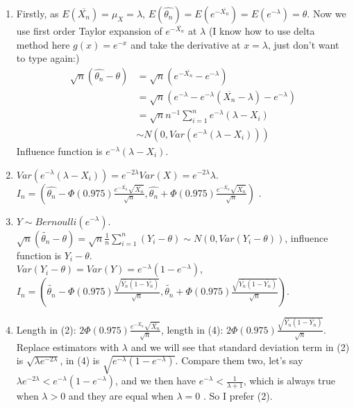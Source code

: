 \documentclass[12pt,letterpaper, onecolumn]{exam}
\begin{document}
\begin{questions}
\begin{solution}
\begin{enumerate}
            \item Firstly, as $E(\overline{X_n})=\mu_X = \lambda$, $E(\hat{\theta_n}) = E(e^{-\overline{X_n}}) =E(e^{-\lambda}) = \theta$.  Now we use first order Taylor expansion of $e^{-\overline{X_n}}$ at $\lambda$ (I know how to use delta method here $g(x) = e^{-x}$ and take the derivative at $x=\lambda$, just don't want to type again:)
            \begin{align*}
                \sqrt{n}(\hat{\theta_n}-\theta) & = \sqrt{n}(e^{-\overline{X_n}}-e^{-\lambda}) \\
                & = \sqrt{n}(e^{-\lambda}-e^{-\lambda}(\overline{X_n}-\lambda)-e^{-\lambda}) \\
                & = \sqrt{n} n^{-1} \sum_{i=1}^n e^{-\lambda}(\lambda-X_i) \\
                & \sim N(0, Var(e^{-\lambda}(\lambda-X_i)))
            \end{align*}
            Influence function is $e^{-\lambda}(\lambda-X_i)$.
        \item $Var(e^{-\lambda}(\lambda-X_i)) = e^{-2\lambda}Var(X) = e^{-2\lambda}\lambda$.\\
        $I_n =  (\hat{\theta_n} - \Phi(0.975)\frac{e^{-\overline{X_n}}\sqrt{\overline{X_n}}}{\sqrt{n}},\hat{\theta_n} +  \Phi(0.975)\frac{e^{-\overline{X_n}}\sqrt{\overline{X_n}}}{\sqrt{n}})$ .
        \item $Y \sim Bernoulli(e^{-\lambda})$. \\
        $\sqrt{n}(\tilde{\theta_n}-\theta) = \sqrt{n}\frac{1}{n}\sum_{i=1}^n (Y_i-\theta) \sim N(0, Var(Y_i-\theta))$, influence function is $Y_i-\theta$. \\
        $Var(Y_i-\theta) = Var(Y) = e^{-\lambda} (1-e^{-\lambda})$, $I_n = (\tilde{\theta_n}-\Phi(0.975)\frac{\sqrt{\overline{Y_n}(1-\overline{Y_n})}}{\sqrt{n}}, \tilde{\theta_n}+\Phi(0.975)\frac{\sqrt{\overline{Y_n}(1-\overline{Y_n})}}{\sqrt{n}})$.
        \item Length in (2): $2\Phi(0.975)\frac{e^{-\overline{X_n}}\sqrt{\overline{X_n}}}{\sqrt{n}}$, length in (4): $2\Phi(0.975)\frac{\sqrt{\overline{Y_n}(1-\overline{Y_n})}}{\sqrt{n}}$. Replace estimators with $\lambda$ and we will see that standard deviation term in (2) is $\sqrt{\lambda e^{-2\lambda}}$, in (4) is $\sqrt{e^{-\lambda}(1-e^{-\lambda})}$. Compare them two, let's say$\lambda e^{-2\lambda} < e^{-\lambda}(1-e^{-\lambda})$,   and we then have $ e^{-\lambda} < \frac{1}{\lambda+1}$, which is always true when $\lambda > 0$ and they are equal when $\lambda = 0$ . So I prefer (2).
        \end{enumerate}
        

\end{solution}
\end{questions}
\end{document}

